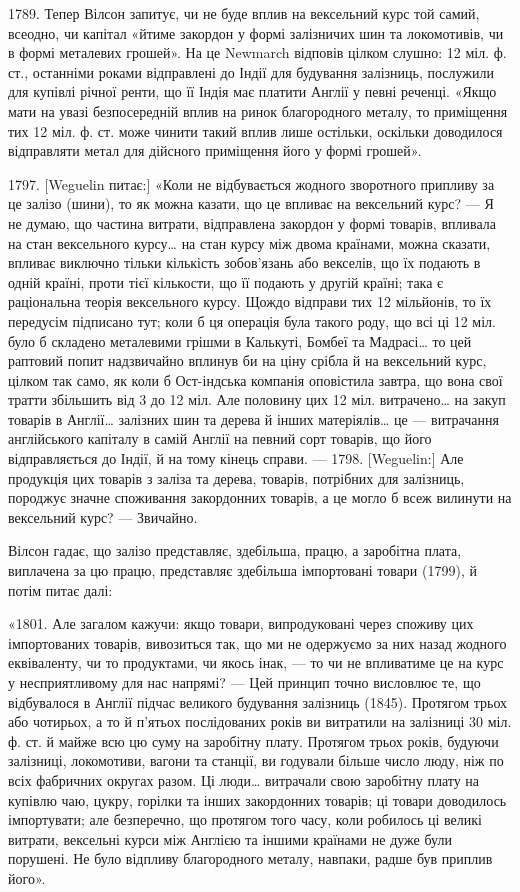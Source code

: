 1789. Тепер Вілсон запитує, чи не буде вплив на вексельний курс той
самий, всеодно, чи капітал «йтиме закордон у формі залізничих шин та локомотивів,
чи в формі металевих грошей». На це Newmarch відповів цілком слушно:
12 міл. ф. ст., останніми роками відправлені до Індії для будування залізниць,
послужили для купівлі річної ренти, що її Індія має платити Англії у певні
реченці. «Якщо мати на увазі безпосередній вплив на ринок благородного металу,
то приміщення тих 12 міл. ф. ст. може чинити такий вплив лише остільки,
оскільки доводилося відправляти метал для дійсного приміщення його у формі
грошей».

1797. [Weguelin питає:] «Коли не відбувається жодного зворотного припливу
за це залізо (шини), то як можна казати, що це впливає на вексельний курс? —
Я не думаю, що частина витрати, відправлена закордон у формі товарів, впливала
на стан вексельного курсу\dots{} на стан курсу між двома країнами, можна
сказати, впливає виключно тільки кількість зобов’язань або векселів, що їх
подають в одній країні, проти тієї кількости, що її подають у другій країні; така
є раціональна теорія вексельного курсу. Щождо відправи тих 12 мільйонів, то
їх передусім підписано тут; коли б ця операція була такого роду, що всі ці
12 міл. було б складено металевими грішми в Калькуті, Бомбеї та Мадрасі\dots{}
то цей раптовий попит надзвичайно вплинув би на ціну срібла й на вексельний
курс, цілком так само, як коли б Ост-індська компанія оповістила завтра, що
вона свої тратти збільшить від 3 до 12 міл. Але половину цих 12 міл. витрачено\dots{}
на закуп товарів в Англії\dots{} залізних шин та дерева й інших матеріялів\dots{}
це — витрачання англійського капіталу в самій Англії на певний сорт
товарів, що його відправляється до Індії, й на тому кінець справи. — 1798.
[Weguelin:] Але продукція цих товарів з заліза та дерева, товарів, потрібних для
залізниць, породжує значне споживання закордонних товарів, а це могло б всеж
вилинути на вексельний курс? — Звичайно.

Вілсон гадає, що залізо представляє, здебільша, працю, а заробітна плата,
виплачена за цю працю, представляє здебільша імпортовані товари (1799), й
потім питає далі:

«1801. Але загалом кажучи: якщо товари, випродуковані через споживу
цих імпортованих товарів, вивозиться так, що ми не одержуємо за них назад
жодного еквіваленту, чи то продуктами, чи якось інак, — то чи не впливатиме
це на курс у несприятливому для нас напрямі? — Цей принцип точно висловлює те,
що відбувалося в Англії підчас великого будування залізниць (1845). Протягом
трьох або чотирьох, а то й п’ятьох послідованих років ви витратили на залізниці
30 міл. ф. ст. й майже всю цю суму на заробітну плату. Протягом трьох років,
будуючи залізниці, локомотиви, вагони та станції, ви годували більше число
люду, ніж по всіх фабричних округах разом. Ці люди\dots{} витрачали свою заробітну
плату на купівлю чаю, цукру, горілки та інших закордонних товарів; ці
товари доводилось імпортувати; але безперечно, що протягом того часу, коли робилось
ці великі витрати, вексельні курси між Англією та іншими країнами не
дуже були порушені. Не було відпливу благородного металу, навпаки, радше був
приплив його».

